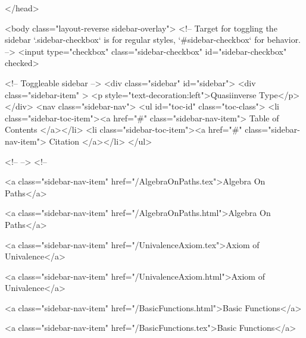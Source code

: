   
</head>




  <body class="layout-reverse sidebar-overlay">
    <!-- Target for toggling the sidebar `.sidebar-checkbox` is for regular
     styles, `#sidebar-checkbox` for behavior. -->
<input type="checkbox" class="sidebar-checkbox" id="sidebar-checkbox" checked>

<!-- Toggleable sidebar -->
<div class="sidebar" id="sidebar">
  <div class="sidebar-item" >
    <p style="text-decoration:left">Quasiinverse Type</p>
  </div>
  <nav class="sidebar-nav">
    <ul id="toc-id" class="toc-class">
  <li class="sidebar-toc-item"><a href="#" class="sidebar-nav-item"> Table of Contents </a></li>
  <li class="sidebar-toc-item"><a href="#" class="sidebar-nav-item"> Citation </a></li>
</ul>


    <!--  -->
    <!-- 
      
    
      
    
      
    
      
        
      
    
      
        
          <a class="sidebar-nav-item" href="/AlgebraOnPaths.tex">Algebra On Paths</a>
        
      
    
      
        
          <a class="sidebar-nav-item" href="/AlgebraOnPaths.html">Algebra On Paths</a>
        
      
    
      
        
          <a class="sidebar-nav-item" href="/UnivalenceAxiom.tex">Axiom of Univalence</a>
        
      
    
      
        
          <a class="sidebar-nav-item" href="/UnivalenceAxiom.html">Axiom of Univalence</a>
        
      
    
      
        
          <a class="sidebar-nav-item" href="/BasicFunctions.html">Basic Functions</a>
        
      
    
      
        
          <a class="sidebar-nav-item" href="/BasicFunctions.tex">Basic Functions</a>
        
      
    
